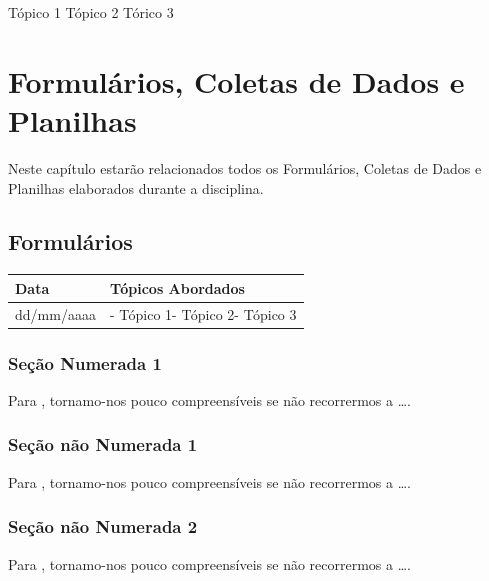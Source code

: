 \documentclass[
]{book}
\begin{document}
Tópico 1
Tópico 2
Tórico 3

\hypertarget{formuluxe1rios-coletas-de-dados-e-planilhas-1}{%
\chapter{Formulários, Coletas de Dados e Planilhas}\label{formuluxe1rios-coletas-de-dados-e-planilhas-1}}

Neste capítulo estarão relacionados todos os Formulários, Coletas de Dados e Planilhas elaborados durante a disciplina.

\hypertarget{formuluxe1rios-1}{%
\section{Formulários}\label{formuluxe1rios-1}}

\begin{longtable}[]{@{}ll@{}}
\toprule()
Data & Tópicos Abordados \\
\midrule()
\endhead
dd/mm/aaaa & - Tópico 1- Tópico 2- Tópico 3 \\
\bottomrule()
\end{longtable}

\hypertarget{seuxe7uxe3o-numerada-1-27}{%
\subsection{Seção Numerada 1}\label{seuxe7uxe3o-numerada-1-27}}

Para \citet{BOCK2001}, tornamo-nos pouco compreensíveis se não recorrermos a \ldots.

\hypertarget{seuxe7uxe3o-nuxe3o-numerada-1-54}{%
\subsection*{Seção não Numerada 1}\label{seuxe7uxe3o-nuxe3o-numerada-1-54}}

Para \citet{BOCK2001}, tornamo-nos pouco compreensíveis se não recorrermos a \ldots.

\hypertarget{seuxe7uxe3o-nuxe3o-numerada-2-81}{%
\subsection*{Seção não Numerada 2}\label{seuxe7uxe3o-nuxe3o-numerada-2-81}}

Para \citet{BOCK2001}, tornamo-nos pouco compreensíveis se não recorrermos a \ldots.
\end{document}
